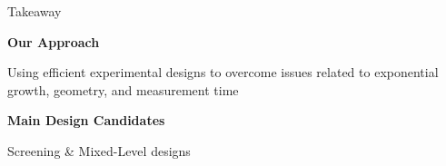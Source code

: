 \documentclass[10pt, compress, aspectratio=169, xcolor={table,usenames,dvipsnames}]{beamer}
\begin{document}
\begin{frame}
\begin{columns}[c]
\begin{block}{Takeaway}
                \vspace{-.1cm}

                \textbf{Our Approach}

                Using \alert{efficient experimental designs} to overcome issues
                related to \alert{exponential growth}, \alert{geometry}, and
                \alert{measurement time}

                \textbf{Main Design Candidates}

                \alert{Screening} \& \alert{Mixed-Level} designs

            \end{block}

    \end{columns}
\end{frame}

\maketitle
\end{document}
